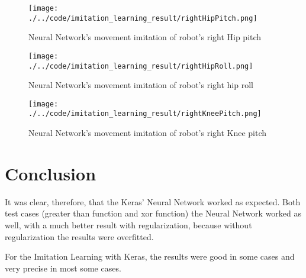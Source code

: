 \documentclass[journal]{IEEEtran}
\begin{document}
\begin{figure}
  \begin{center}
  \texttt{[image: ./../code/imitation\_learning\_result/rightHipPitch.png]}
  \caption{Neural Network's movement imitation of robot's right Hip pitch}
  \label{img:right_hip_pitch}
  \end{center}
\end{figure}

\begin{figure}
  \begin{center}
  \texttt{[image: ./../code/imitation\_learning\_result/rightHipRoll.png]}
  \caption{Neural Network's movement imitation of robot's right hip roll}
  \label{img:right_hip_roll}
  \end{center}
\end{figure}

\begin{figure}
  \begin{center}
  \texttt{[image: ./../code/imitation\_learning\_result/rightKneePitch.png]}
  \caption{Neural Network's movement imitation of robot's right Knee pitch}
  \label{img:right_knee_pitch}
  \end{center}
\end{figure}

\section {Conclusion}

It was clear, therefore, that the Keras' Neural Network worked as expected. Both test cases (greater than function and xor function) the Neural Network worked as well, with a much better result with regularization, because without regularization the results were overfitted.

For the Imitation Learning with Keras, the results were good in some cases and very precise in most some cases.

\vfill
\end{document}
